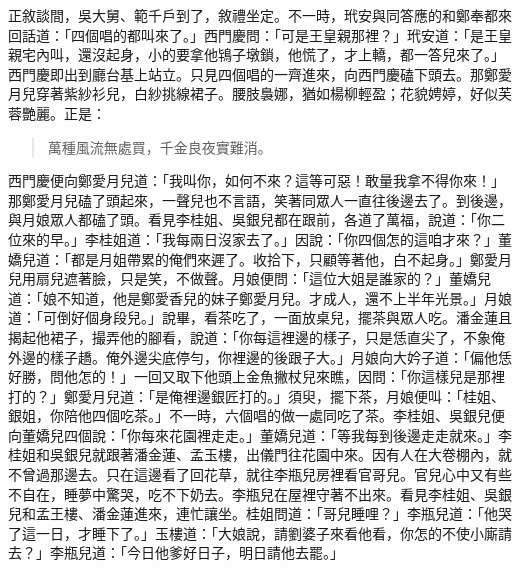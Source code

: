 正敘談間，吳大舅、範千戶到了，敘禮坐定。不一時，玳安與同答應的和鄭奉都來回話道：「四個唱的都叫來了。」西門慶問：「可是王皇親那裡？」玳安道：「是王皇親宅內叫，還沒起身，小的要拿他鴇子墩鎖，他慌了，才上轎，都一答兒來了。」西門慶即出到廳台基上站立。只見四個唱的一齊進來，向西門慶磕下頭去。那鄭愛月兒穿著紫紗衫兒，白紗挑線裙子。腰肢裊娜，猶如楊柳輕盈；花貌娉婷，好似芙蓉艷麗。正是：
\begin{quote}
萬種風流無處買，千金良夜實難消。
\end{quote}

西門慶便向鄭愛月兒道：「我叫你，如何不來？這等可惡！敢量我拿不得你來！」那鄭愛月兒磕了頭起來，一聲兒也不言語，笑著同眾人一直往後邊去了。到後邊，與月娘眾人都磕了頭。看見李桂姐、吳銀兒都在跟前，各道了萬福，說道：「你二位來的早。」李桂姐道：「我每兩日沒家去了。」因說：「你四個怎的這咱才來？」董嬌兒道：「都是月姐帶累的俺們來遲了。收拾下，只顧等著他，白不起身。」鄭愛月兒用扇兒遮著臉，只是笑，不做聲。月娘便問：「這位大姐是誰家的？」董嬌兒道：「娘不知道，他是鄭愛香兒的妹子鄭愛月兒。才成人，還不上半年光景。」月娘道：「可倒好個身段兒。」說畢，看茶吃了，一面放桌兒，擺茶與眾人吃。潘金蓮且揭起他裙子，撮弄他的腳看，說道：「你每這裡邊的樣子，只是恁直尖了，不象俺外邊的樣子趫。俺外邊尖底停勻，你裡邊的後跟子大。」月娘向大妗子道：「偏他恁好勝，問他怎的！」一回又取下他頭上金魚撇杖兒來瞧，因問：「你這樣兒是那裡打的？」鄭愛月兒道：「是俺裡邊銀匠打的。」須臾，擺下茶，月娘便叫：「桂姐、銀姐，你陪他四個吃茶。」不一時，六個唱的做一處同吃了茶。李桂姐、吳銀兒便向董嬌兒四個說：「你每來花園裡走走。」董嬌兒道：「等我每到後邊走走就來。」李桂姐和吳銀兒就跟著潘金蓮、孟玉樓，出儀門往花園中來。因有人在大卷棚內，就不曾過那邊去。只在這邊看了回花草，就往李瓶兒房裡看官哥兒。官兒心中又有些不自在，睡夢中驚哭，吃不下奶去。李瓶兒在屋裡守著不出來。看見李桂姐、吳銀兒和孟王樓、潘金蓮進來，連忙讓坐。桂姐問道：「哥兒睡哩？」李瓶兒道：「他哭了這一日，才睡下了。」玉樓道：「大娘說，請劉婆子來看他看，你怎的不使小廝請去？」李瓶兒道：「今日他爹好日子，明日請他去罷。」

